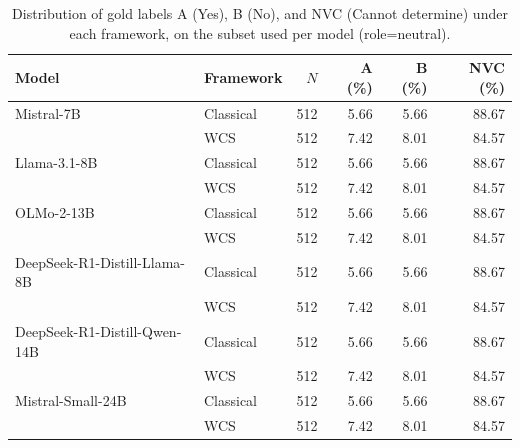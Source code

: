 \begin{table}[htbp]
\caption{Distribution of gold labels A (Yes), B (No), and NVC (Cannot determine) under each framework, on the subset used per model (role=neutral).}
\label{tab:nvc-gold-distribution}
\begin{tabular}{llrrrr}
\toprule
Model & Framework & $N$ & A (\%) & B (\%) & NVC (\%) \\
\midrule
Mistral-7B & Classical & 512 & 5.66 & 5.66 & 88.67 \\
 & WCS & 512 & 7.42 & 8.01 & 84.57 \\
Llama-3.1-8B & Classical & 512 & 5.66 & 5.66 & 88.67 \\
 & WCS & 512 & 7.42 & 8.01 & 84.57 \\
OLMo-2-13B & Classical & 512 & 5.66 & 5.66 & 88.67 \\
 & WCS & 512 & 7.42 & 8.01 & 84.57 \\
DeepSeek-R1-Distill-Llama-8B & Classical & 512 & 5.66 & 5.66 & 88.67 \\
 & WCS & 512 & 7.42 & 8.01 & 84.57 \\
DeepSeek-R1-Distill-Qwen-14B & Classical & 512 & 5.66 & 5.66 & 88.67 \\
 & WCS & 512 & 7.42 & 8.01 & 84.57 \\
Mistral-Small-24B & Classical & 512 & 5.66 & 5.66 & 88.67 \\
 & WCS & 512 & 7.42 & 8.01 & 84.57 \\
\bottomrule
\end{tabular}
\end{table}
